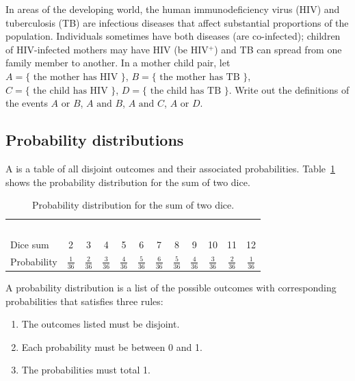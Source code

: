 \begin{exercise}

In areas of the developing world, the human immunodeficiency virus (HIV) and tuberculosis (TB) are infectious diseases that affect substantial proportions of the population.  Individuals sometimes have both diseases (are co-infected); children of HIV-infected mothers may have HIV (be HIV$^+$) and TB can spread from one family member to another.  In a mother child pair, let $A = \{\text{ the mother has HIV } \}$,  $B = \{\textrm{ the mother has TB } \}$, $C = \{\text{ the child has HIV } \}$,  $D = \{\text{ the child has TB } \}$.  Write out the definitions of the events $A \text{ or } B$, $A \text{ and } B$, $A \text{ and } C$, $A \text{ or } D$.   

\end{exercise}

\subsection{Probability distributions}



A  is a table of all disjoint outcomes and their associated probabilities. Table~\ref{diceProb} shows the probability distribution for the sum of two dice. 

\begin{table}[h] \small
\centering
\begin{tabular}{l ccc ccc ccc cc}
  \hline
  \ \vspace{-3mm} \\
Dice sum\vspace{0.3mm} & 2 & 3 & 4 & 5 & 6 & 7 & 8 & 9 & 10 & 11 & 12  \\
Probability & $\frac{1}{36}$ & $\frac{2}{36}$ & $\frac{3}{36}$ & $\frac{4}{36}$ & $\frac{5}{36}$ & $\frac{6}{36}$ & $\frac{5}{36}$ & $\frac{4}{36}$ & $\frac{3}{36}$ & $\frac{2}{36}$ & $\frac{1}{36}$\vspace{1mm} \\
   \hline
\end{tabular}
\caption{Probability distribution for the sum of two dice.}
\label{diceProb}
\end{table}

\begin{termBox}{
A probability distribution is a list of the possible outcomes with corresponding probabilities that satisfies three rules: \vspace{-2mm}
\begin{enumerate}
\setlength{\itemsep}{0mm}
\item The outcomes listed must be disjoint.
\item Each probability must be between 0 and 1.
\item The probabilities must total 1. \vspace{1mm}
\end{enumerate}}
\end{termBox}

